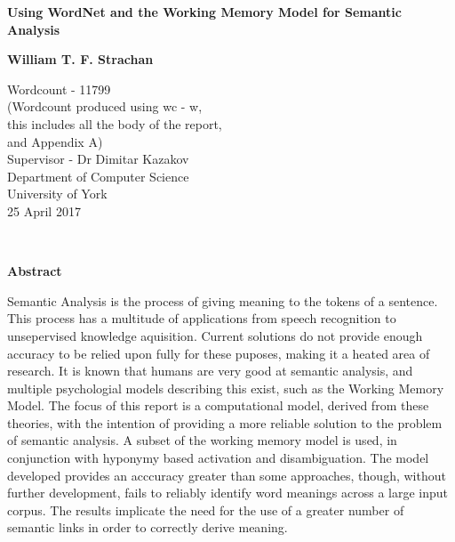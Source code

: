 \documentclass[]{article}
\begin{document}
\begin{titlepage}
    \begin{center}
        \vspace*{1cm}
        
        \Huge
        \textbf{Using WordNet and the Working Memory Model for Semantic Analysis}
        \vspace{2cm}
        
        \Large
        \textbf{William T. F. Strachan}
        
        \vfill
                
        \vspace{0.8cm}
        
        \Large
        Wordcount - 11799\\
        \small
        (Wordcount produced using wc - w, \\
        this includes all the body of the report,\\
         and Appendix A)\\
        \large
        \vspace{0.8cm}
        Supervisor - Dr Dimitar Kazakov\\
        Department of Computer Science\\
        University of York\\
        25 April 2017
        
    \end{center}
\end{titlepage}
\
\vfill
\begin{center} 
	\textbf{Abstract}
\end{center} 
\label{sec:Abstract}
Semantic Analysis is the process of giving meaning to the tokens of a sentence. This process has a multitude of applications from speech recognition to unsepervised knowledge aquisition. Current solutions do not provide enough accuracy to be relied upon fully for these puposes, making it a heated area of research. It is known that humans are very good at semantic analysis, and multiple psychologial models describing this exist, such as the Working Memory Model. The focus of this report is a computational model, derived from these theories, with the intention of providing a more reliable solution to the problem of semantic analysis. A subset of the working memory model is used, in conjunction with hyponymy based activation and disambiguation. The model developed provides an acccuracy greater than some approaches, though, without further development, fails to reliably identify word meanings across a large input corpus. The results implicate the need for the use of a greater number of semantic links in order to correctly derive meaning.
\end{document}

